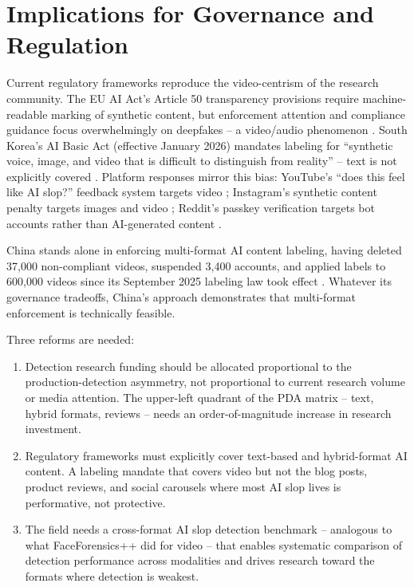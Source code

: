 \documentclass[12pt]{article}
\begin{document}
\section{Implications for Governance and Regulation}

Current regulatory frameworks reproduce the video-centrism of the research community. The EU AI Act's Article 50 transparency provisions require machine-readable marking of synthetic content, but enforcement attention and compliance guidance focus overwhelmingly on deepfakes -- a video/audio phenomenon \cite{euaiact2026}. South Korea's AI Basic Act (effective January 2026) mandates labeling for ``synthetic voice, image, and video that is difficult to distinguish from reality'' -- text is not explicitly covered \cite{koreaaiact2026}. Platform responses mirror this bias: YouTube's ``does this feel like AI slop?'' feedback system targets video \cite{dexerto2026youtube}; Instagram's synthetic content penalty targets images and video \cite{clippie2026instagram}; Reddit's passkey verification targets bot accounts rather than AI-generated content \cite{reddit2026}.

China stands alone in enforcing multi-format AI content labeling, having deleted 37,000 non-compliant videos, suspended 3,400 accounts, and applied labels to 600,000 videos since its September 2025 labeling law took effect \cite{china2025labeling}. Whatever its governance tradeoffs, China's approach demonstrates that multi-format enforcement is technically feasible.

Three reforms are needed:
\begin{enumerate}[leftmargin=*]
    \item Detection research funding should be allocated proportional to the production-detection asymmetry, not proportional to current research volume or media attention. The upper-left quadrant of the PDA matrix -- text, hybrid formats, reviews -- needs an order-of-magnitude increase in research investment.
    \item Regulatory frameworks must explicitly cover text-based and hybrid-format AI content. A labeling mandate that covers video but not the blog posts, product reviews, and social carousels where most AI slop lives is performative, not protective.
    \item The field needs a cross-format AI slop detection benchmark -- analogous to what FaceForensics++ did for video -- that enables systematic comparison of detection performance across modalities and drives research toward the formats where detection is weakest.
\end{enumerate}
\end{document}
